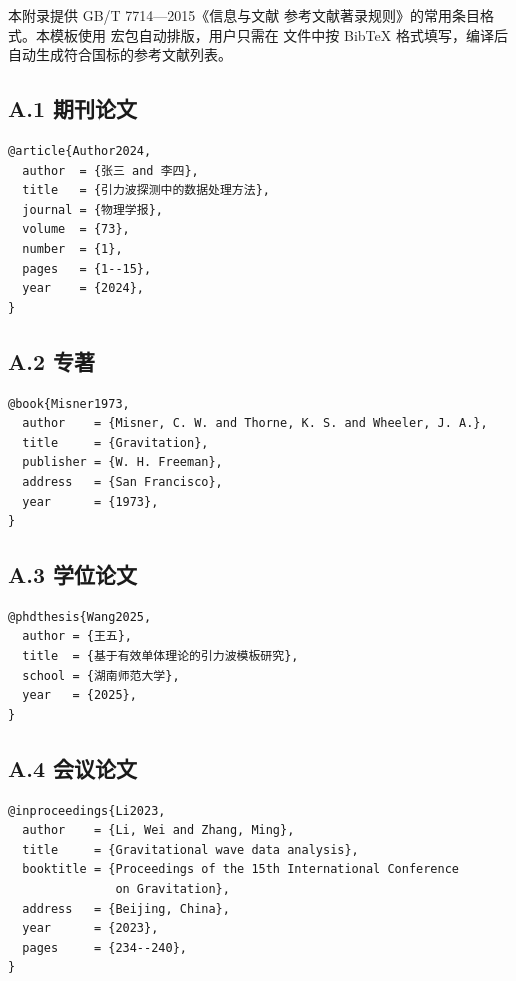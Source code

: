 \documentclass[../main-manual.tex]{subfiles}
\begin{document}
\cleardoublepage
\chapappendix

 \label{App:gbt7714}

本附录提供 GB/T 7714—2015《信息与文献 参考文献著录规则》的常用条目格式。本模板使用  宏包自动排版，用户只需在  文件中按 Bib\TeX{} 格式填写，编译后自动生成符合国标的参考文献列表。

\subsection*{A.1 期刊论文}

\begin{lstlisting}[language=TeX, caption={期刊论文 BibTeX 条目}]
@article{Author2024,
  author  = {张三 and 李四},
  title   = {引力波探测中的数据处理方法},
  journal = {物理学报},
  volume  = {73},
  number  = {1},
  pages   = {1--15},
  year    = {2024},
}
\end{lstlisting}

\subsection*{A.2 专著}

\begin{lstlisting}[language=TeX, caption={专著 BibTeX 条目}]
@book{Misner1973,
  author    = {Misner, C. W. and Thorne, K. S. and Wheeler, J. A.},
  title     = {Gravitation},
  publisher = {W. H. Freeman},
  address   = {San Francisco},
  year      = {1973},
}
\end{lstlisting}

\subsection*{A.3 学位论文}

\begin{lstlisting}[language=TeX, caption={学位论文 BibTeX 条目}]
@phdthesis{Wang2025,
  author = {王五},
  title  = {基于有效单体理论的引力波模板研究},
  school = {湖南师范大学},
  year   = {2025},
}
\end{lstlisting}

\subsection*{A.4 会议论文}

\begin{lstlisting}[language=TeX, caption={会议论文 BibTeX 条目}]
@inproceedings{Li2023,
  author    = {Li, Wei and Zhang, Ming},
  title     = {Gravitational wave data analysis},
  booktitle = {Proceedings of the 15th International Conference
               on Gravitation},
  address   = {Beijing, China},
  year      = {2023},
  pages     = {234--240},
}
\end{lstlisting}
\end{document}

